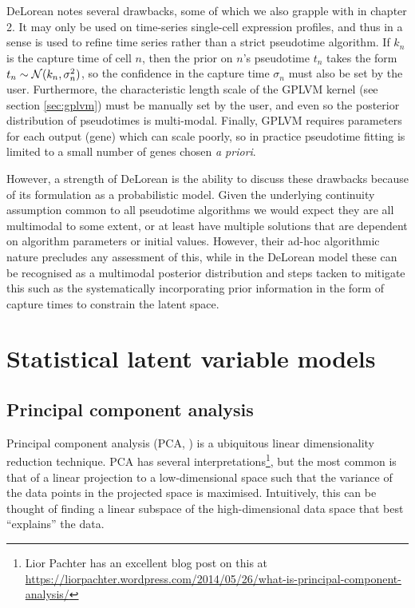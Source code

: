 DeLorean notes several drawbacks, some of which  we also grapple with in chapter 2. It may only be used on time-series single-cell expression profiles, and thus in a sense is used to refine time series rather than a strict pseudotime algorithm. If $k_n$ is the capture time of cell $n$, then the prior on $n$'s pseudotime $t_n$ takes the form $t_n \sim \mathcal{N}(k_n, \sigma_n^2)$, so the confidence in the capture time $\sigma_n$ must also be set by the user. Furthermore, the characteristic length scale of the GPLVM kernel (see section \ref{sec:gplvm}) must be manually set by the user, and even so the posterior distribution of pseudotimes is multi-modal. Finally, GPLVM requires parameters for each output (gene) which can scale poorly, so in practice pseudotime fitting is limited to a small number of genes chosen \emph{a priori}.

However, a strength of DeLorean is the ability to discuss these drawbacks because of its formulation as a probabilistic model. Given the underlying continuity assumption common to all pseudotime algorithms we would expect they are all multimodal to some extent, or at least have multiple solutions that are dependent on algorithm parameters or initial values. However, their ad-hoc algorithmic nature precludes any assessment of this, while in the DeLorean model these can be recognised as a multimodal posterior distribution and steps tacken to mitigate this such as the systematically incorporating prior information in the form of capture times to constrain the latent space.




\section{Statistical latent variable models}

\subsection{Principal component analysis} \label{sec:intr:pca}

Principal component analysis (PCA, \cite{jolliffe2002principal}) is a ubiquitous linear dimensionality reduction technique. PCA has several interpretations\footnote{Lior Pachter has an excellent blog post on this at \url{https://liorpachter.wordpress.com/2014/05/26/what-is-principal-component-analysis/}}, but the most common is that of a linear projection to a low-dimensional space such that the variance of the data points in the projected space is maximised. Intuitively, this can be thought of finding a linear subspace of the high-dimensional data space that best ``explains''
the data.

